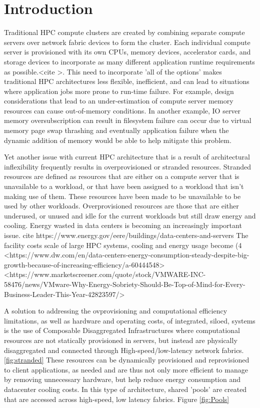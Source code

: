 \section{Introduction}

Traditional HPC compute clusters are created by combining separate compute servers over network fabric devices to form the cluster.  Each individual compute server is provisioned with its own CPUs, memory devices, accelerator cards, and storage devices to incorporate as many different application runtime requirements as possible.<cite >. This need to incorporate 'all of the options' makes traditional HPC architectures less flexible, inefficient, and can lead to situations where application jobs more prone to run-time failure.    
For example, design considerations that lead to an under-estimation of compute server memory resources can cause out-of-memory conditions.  In another example, IO server memory oversubscription can result in filesystem failure can occur due to virtual memory page swap thrashing and eventually application failure when the dynamic addition of memory would be able to help mitigate this problem.  

Yet another issue with current HPC architecture that is a result of architectural inflexibility frequently results in overprovisioned or stranded resources.  Stranded resources are defined as resources that are either on a compute server that is unavailable to a workload, or that have been assigned to a workload that isn't making use of them.  These resources have been made to be unavailable to be used by other workloads. Overprovisioned resources are those that are either underused, or unused and idle for the current workloads but still draw energy and cooling.  Energy wasted in data centers is becoming an increasingly important issue.  {cite https://www.energy.gov/eere/buildings/data-centers-and-servers } 
The facility costs scale of large HPC systems, cooling and energy usage become  
  (4%
  <https://www.dw.com/en/data-centers-energy-consumption-steady-despite-big-growth-because-of-increasing-efficiency/a-60444548>
  <https://www.marketscreener.com/quote/stock/VMWARE-INC-58476/news/VMware-Why-Energy-Sobriety-Should-Be-Top-of-Mind-for-Every-Business-Leader-This-Year-42823597/>

A solution to addressing the ovprovisioning and computational efficiency limitations, as well as hardware and operating costs, of integrated, siloed, systems is the use of Composable Disaggregated Infrastructures where computational resources are not statically provisioned in servers, but instead are physically disaggregated and connected through High-speed/low-latency network fabrics.  \ref{fig:stranded}  These resources can be dynamically provisioned and reprovisioned to client applications, as needed and are thus not only more efficient to manage by removing unnecessary hardware, but help reduce energy consumption and datacenter cooling costs.  In this type of architecture, shared 'pools' are created that are accessed across high-speed, low latency fabrics. Figure \ref{fig:Pools}


